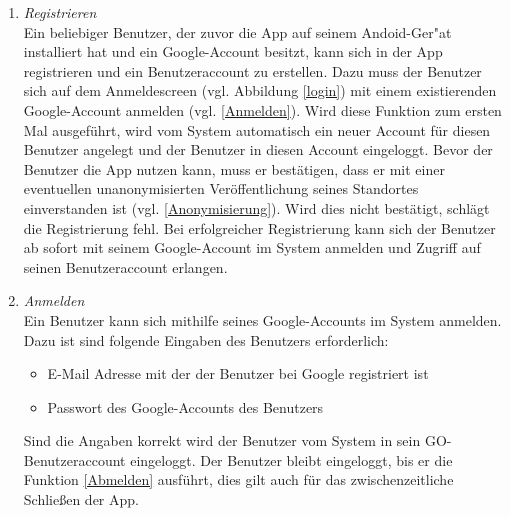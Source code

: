 \documentclass[parskip=full]{scrartcl}
\def\threedigits#1{%
  \ifnum#1<100 0\fi
  \ifnum#1<10 0\fi
  \number#1}
\begin{document}
\begin{enumerate}[label={\textbf{/F\protect\threedigits{\theenumi}0/}}, leftmargin=*]
	
	\item \textit{Registrieren}\label{Registrieren} \\ Ein beliebiger Benutzer, der zuvor die App auf seinem Andoid-Ger"at installiert hat und ein Google-Account besitzt, kann sich in der App registrieren und ein Benutzeraccount zu erstellen. Dazu muss der Benutzer sich auf dem Anmeldescreen (vgl. Abbildung \ref{login}) mit einem existierenden Google-Account anmelden (vgl. \ref{Anmelden}). Wird diese Funktion zum ersten Mal ausgeführt, wird vom System automatisch ein neuer Account für diesen Benutzer angelegt und der Benutzer in diesen Account eingeloggt. Bevor der Benutzer die App nutzen kann, muss er bestätigen, dass er mit einer eventuellen unanonymisierten Veröffentlichung seines Standortes einverstanden ist (vgl. \ref{Anonymisierung}). Wird dies nicht bestätigt, schlägt die Registrierung fehl.
	Bei erfolgreicher Registrierung kann sich der Benutzer ab sofort mit seinem Google-Account im System anmelden und Zugriff auf seinen Benutzeraccount erlangen.

	 	
	\item \textit{Anmelden} \label{Anmelden} \\ Ein Benutzer kann sich mithilfe seines Google-Accounts im System anmelden. Dazu ist sind folgende Eingaben des Benutzers erforderlich:
	\begin{itemize}
		\item E-Mail Adresse mit der der Benutzer bei Google registriert ist
		\item Passwort des Google-Accounts des Benutzers
	\end{itemize}
	Sind die Angaben korrekt wird der Benutzer vom System in sein GO-Benutzeraccount eingeloggt. Der Benutzer bleibt eingeloggt, bis er die Funktion \ref{Abmelden} ausführt, dies gilt auch für das zwischenzeitliche Schließen der App.
	
	

\end{enumerate}
\end{document}
